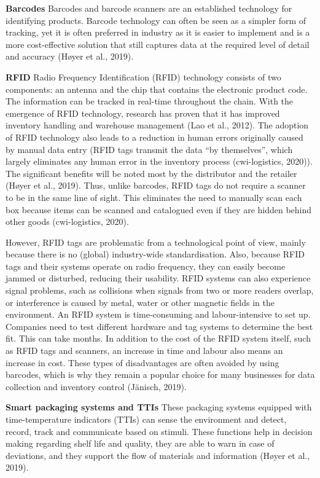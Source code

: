 \documentclass[
]{book}
\begin{document}
\textbf{Barcodes}
Barcodes and barcode scanners are an established technology for identifying products. Barcode technology can often be seen as a simpler form of tracking, yet it is often preferred in industry as it is easier to implement and is a more cost-effective solution that still captures data at the required level of detail and accuracy (Høyer et al., 2019).

\textbf{RFID}
Radio Frequency Identification (RFID) technology consists of two components: an antenna and the chip that contains the electronic product code. The information can be tracked in real-time throughout the chain. With the emergence of RFID technology, research has proven that it has improved inventory handling and warehouse management (Lao et al., 2012). The adoption of RFID technology also leads to a reduction in human errors originally caused by manual data entry (RFID tags transmit the data ``by themselves'', which largely eliminates any human error in the inventory process (cwi-logistics, 2020)). The significant benefits will be noted most by the distributor and the retailer (Høyer et al., 2019).
Thus, unlike barcodes, RFID tags do not require a scanner to be in the same line of sight. This eliminates the need to manually scan each box because items can be scanned and catalogued even if they are hidden behind other goods (cwi-logistics, 2020).

However, RFID tags are problematic from a technological point of view, mainly because there is no (global) industry-wide standardisation. Also, because RFID tags and their systems operate on radio frequency, they can easily become jammed or disturbed, reducing their usability. RFID systems can also experience signal problems, such as collisions when signals from two or more readers overlap, or interference is caused by metal, water or other magnetic fields in the environment. An RFID system is time-consuming and labour-intensive to set up. Companies need to test different hardware and tag systems to determine the best fit. This can take months. In addition to the cost of the RFID system itself, such as RFID tags and scanners, an increase in time and labour also means an increase in cost. These types of disadvantages are often avoided by using barcodes, which is why they remain a popular choice for many businesses for data collection and inventory control (Jänisch, 2019).

\textbf{Smart packaging systems and TTIs}
These packaging systems equipped with time-temperature indicators (TTIs) can sense the environment and detect, record, track and communicate based on stimuli. These functions help in decision making regarding shelf life and quality, they are able to warn in case of deviations, and they support the flow of materials and information (Høyer et al., 2019).
\end{document}
